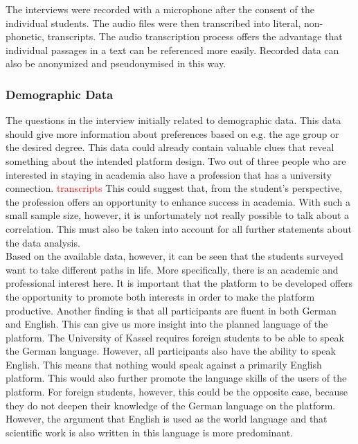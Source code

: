 The interviews were recorded with a microphone after the consent of the individual students.
The audio files were then transcribed into literal, non-phonetic, transcripts.
The audio transcription process offers the advantage that individual passages in a text can be referenced more easily.
Recorded data can also be anonymized and pseudonymised in this way.

\subsubsection{Demographic Data}
The questions in the interview initially related to demographic data.
This data should give more information about preferences based on e.g. the age group or the desired degree.
This data could already contain valuable clues that reveal something about the intended platform design.
Two out of three people who are interested in staying in academia also have a profession that has a university connection. \textcolor{red}{transcripts}
This could suggest that, from the student's perspective, the profession offers an opportunity to enhance success in academia.
With such a small sample size, however, it is unfortunately not really possible to talk about a correlation.
This must also be taken into account for all further statements about the data analysis.\\

Based on the available data, however, it can be seen that the students surveyed want to take different paths in life.
More specifically, there is an academic and professional interest here.
It is important that the platform to be developed offers the opportunity to promote both interests in order to make the platform productive.
Another finding is that all participants are fluent in both German and English.
This can give us more insight into the planned language of the platform.
The University of Kassel requires foreign students to be able to speak the German language.
However, all participants also have the ability to speak English.
This means that nothing would speak against a primarily English platform.
This would also further promote the language skills of the users of the platform.
For foreign students, however, this could be the opposite case, because they do not deepen their knowledge of the German language on the platform.
However, the argument that English is used as the world language and that scientific work is also written in this language is more predominant.\\

